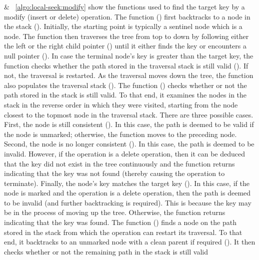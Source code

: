  $\&$ ~\ref{algo:local-seek:modify} show the functions used to find the target key by a modify (insert or delete) operation. The function \SeekForModify{} () first backtracks to a \mysafe{} node in the stack (). Initially, the starting point is typically a sentinel node which is a \mysafe{} node. The function then traverses the tree from top to down by following either the left or the right child pointer () until it either finds the key or encounters a null pointer (). In case the terminal node's key is greater than the target key, the function checks whether the path stored in the traversal stack is still valid (). If not, the traversal is restarted. As the traversal moves down the tree, the function also populates the traversal stack (). The function \FindAdmissible{} () checks whether or not the path stored in the stack is still valid. To that end, it examines  the \myanchor{} nodes in the stack in the reverse order in which they were visited, starting from the \myanchor{} node closest to the topmost node in the traversal stack. There are three possible cases. First, the \myanchor{} node is still consistent (). In this case, the path is deemed to be valid if the \myanchor{} node is unmarked; otherwise, the function moves to the preceding \myanchor{} node. Second, the \myanchor{} node is no longer consistent (). In this case, the path is deemed to be invalid. However, if the operation is a delete operation, then it can be deduced that the key did not exist in the tree  continuously and the function returns indicating that the key was not found (thereby causing the operation to terminate). Finally, the \myanchor{} node's key matches the target key (). In this case, if the \myanchor{} node is marked and the operation is a delete operation, then the path is deemed to be invalid (and further backtracking is required). This is because the key may be in the process of moving up the tree. Otherwise, the function returns indicating that the key was found. The function \FindStartPoint{} () finds a \mysafe{} node on the path stored in the stack from which the operation can restart its traversal. To that end, it backtracks to an unmarked node with a clean parent if required (). It then checks whether or not the remaining path in the stack is still valid 